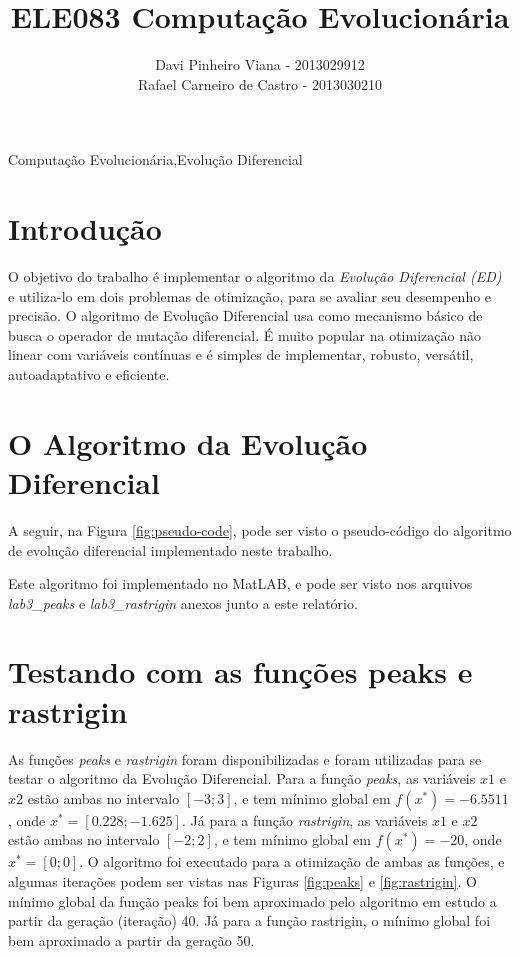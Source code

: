 \documentclass[12pt]{elsarticle}
\begin{document}
	\begin{frontmatter}

		\title{ELE083 Computação Evolucionária\\ }
		\author{Davi Pinheiro Viana - 2013029912\\Rafael Carneiro de Castro - 2013030210}
		\address{Minas Gerais, Brasil}
		
		\begin{keyword}
			Computação Evolucionária\sep Evolução Diferencial
		\end{keyword}
	\end{frontmatter}
	
	\section{Introdução}
	O objetivo do trabalho é implementar o algoritmo da \emph{Evolução Diferencial (ED)} e utiliza-lo em dois problemas de otimização, para se avaliar seu desempenho e precisão. O algoritmo de Evolução Diferencial usa como mecanismo básico de busca o operador de mutação diferencial. É muito popular na otimização não linear com variáveis contínuas e é simples de implementar, robusto, versátil, autoadaptativo e eficiente.

	\section{O Algoritmo da Evolução Diferencial}
	A seguir, na Figura \ref{fig:pseudo-code}, pode ser visto o pseudo-código do algoritmo de evolução diferencial implementado neste trabalho.
	
	Este algoritmo foi implementado no MatLAB, e pode ser visto nos arquivos \textit{lab3\_peaks} e \textit{lab3\_rastrigin} anexos junto a este relatório.
	
	\section{Testando com as funções peaks e rastrigin}
	As funções \textit{peaks} e \textit{rastrigin} foram disponibilizadas e foram utilizadas para se testar o algoritmo da Evolução Diferencial. Para a função \textit{peaks}, as variáveis $x1$ e $x2$ estão ambas no intervalo $[-3; 3]$, e tem mínimo global em $f(x^*) = -6.5511$, onde $x^* = [0.228; -1.625]$. Já para a função \textit{rastrigin}, as variáveis $x1$ e $x2$ estão ambas no intervalo $[-2; 2]$, e tem mínimo global em $f(x^*) = -20$, onde $x^* = [0; 0]$. O algoritmo foi executado para a otimização de ambas as funções, e algumas iterações podem ser vistas nas Figuras \ref{fig:peaks} e \ref{fig:rastrigin}. O mínimo global da função peaks foi bem aproximado pelo algoritmo em estudo a partir da geração (iteração) 40. Já para a função rastrigin, o mínimo global foi bem aproximado a partir da geração 50.
	
\end{document}
